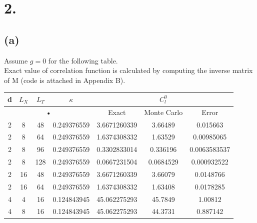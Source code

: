\documentclass[12pt]{article}
\begin{document}
\section*{2.}
\subsection*{(a)}
Assume $g=0$ for the following table. \\
Exact value of correlation function is calculated by computing the inverse matrix of M (code is attached in Appendix B). \\
\begin{center}
\begin{tabular}{|c|c|c|c|c|c|c|}
\hline 
d & $L_X$ & $L_T$ & $\kappa$ & \multicolumn{3}{c|}{$C_l^0$} \\ 
\hline 
\multicolumn{4}{|c|}{•} & Exact & Monte Carlo & Error\\ 
\hline 
2 & 8 & 48 & 0.249376559 & 3.6671260339 & 3.66489 & 0.015663\\ 
\hline 
2 & 8 & 64 & 0.249376559 & 1.6374308332 & 1.63529 & 0.00985065\\ 
\hline 
2 & 8 & 96 & 0.249376559 & 0.3302833014 & 0.336196 & 0.0063583537\\ 
\hline 
2 & 8 & 128 & 0.249376559 & 0.0667231504 & 0.0684529 & 0.000932522\\ 
\hline 
2 & 16 & 48 & 0.249376559 & 3.6671260339 & 3.66079 & 0.0148766\\ 
\hline 
2 & 16 & 64 & 0.249376559 & 1.6374308332 & 1.63408 & 0.0178285\\ 
\hline 
4 & 4 & 16 & 0.124843945 & 45.062275293 & 45.7849 & 1.00812\\ 
\hline 
4 & 8 & 16 & 0.124843945 & 45.062275293 & 44.3731 & 0.887142\\ 
\hline 
\end{tabular}
\end{center} 
\newpage
\end{document}
